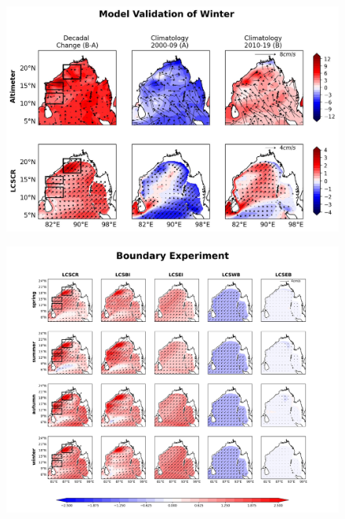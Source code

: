 \documentclass[review]{elsarticle}
\begin{document}
\begin{figure}[!h]
	\begin{center}
		\includegraphics[width=1\textwidth]{./images/Winter_Mod_val.jpg}
		\caption {
		}
		\label{fig:paper_07}
	\end{center}
\end{figure}
\clearpage

\begin{figure}[!h]
	\begin{center}
		\includegraphics[width=1\textwidth]{./images/boundary_expt.jpg}
		\caption {
		}
		\label{fig:paper_08}
	\end{center}
\end{figure}
\clearpage
\end{document}
